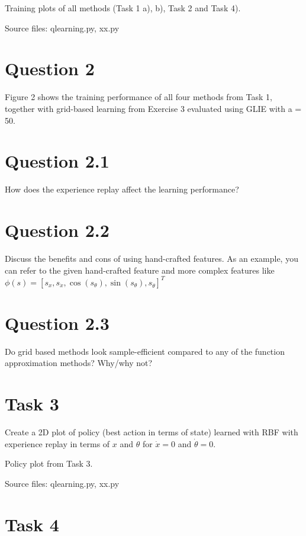 \documentclass[12pt]{article}
\begin{document}
Training plots of all methods (Task 1 a), b), Task 2 and Task 4).
\newline

\noindent
Source files: qlearning.py, xx.py 

\section*{Question 2}

Figure 2 shows the training performance of all four methods from Task 1, together
with grid-based learning from Exercise 3 evaluated using GLIE with a = 50.

\section*{Question 2.1}

How does the experience replay affect the learning performance?

\section*{Question 2.2}

Discuss the benefits and cons of using hand-crafted features. As an example, you can refer to 
the given hand-crafted feature and more complex features like
$\phi(s) = [s_x, s_{\dot{x}}, \operatorname{cos}(s_{\theta}), \operatorname{sin}(s_{\theta}), s_{\dot{\theta}}]^T$

\section*{Question 2.3}

Do grid based methods look sample-efficient compared to any of the
function approximation methods? Why/why not?

\section*{Task 3}

Create a 2D plot of policy (best action in terms of state) learned with RBF
with experience replay in terms of $x$ and $\theta$ for $\dot{x}=0$ and $\dot{\theta}=0$.
\newline

Policy plot from Task 3.
\newline

\noindent
Source files: qlearning.py, xx.py 

\section*{Task 4}
\end{document}
